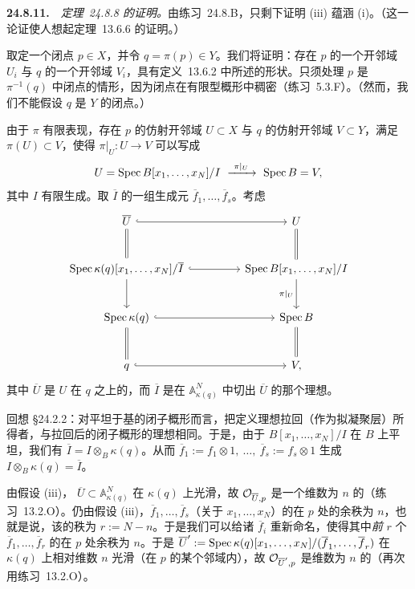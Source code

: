 \textbf{24.8.11.}\ \extrahard\ \emph{\mbox{定理~24.8.8} 的证明。}\quad 由\mbox{练习~24.8.B}，只剩下证明 (iii) 蕴涵 (i)。（这一论证使人想起\mbox{定理~13.6.6} 的证明。）

取定一个闭点 $p\in X$，并令 $q=\pi(p)\in Y$。我们将证明：存在 $p$ 的一个开邻域 $U_i$ 与 $q$ 的一个开邻域 $V_i$，具有\mbox{定义~13.6.2} 中所述的形状。只须处理 $p$ 是 $\pi^{-1}(q)$ 中闭点的情形，因为闭点在有限型概形中稠密（\mbox{练习~5.3.F}）。（然而，我们不能假设 $q$ 是 $Y$ 的闭点。）

由于 $\pi$ 有限表现，存在 $p$ 的仿射开邻域 $U\subset X$ 与 $q$ 的仿射开邻域 $V\subset Y$，满足 $\pi(U)\subset V$，使得\trMorphism{} $\pi|_U\colon U\to V$ 可以写成
\[
U=\Spec B[x_1,\dots,x_N]/I\ \xrightarrow{\ \pi|_U\ }\ \Spec B=V,
\]
其中 $I$ 有限生成。取 $\overline{I}$ 的一组生成元 $\overline{f}_1,\dots,\overline{f}_s$。考虑\trCartesianDiagram
\[
\begin{tikzcd}[row sep=2.6em, column sep=4.6em]
\overline{U} \ar[r, hook] \ar[d, equals] & U \ar[d, equals] \\
\Spec\kappa(q)[x_1,\dots,x_N]/\overline{I} \ar[r, hook] \ar[d] & \Spec B[x_1,\dots,x_N]/I \ar[d, "\pi|_U"'] \\
\Spec\kappa(q) \ar[r, hook] \ar[d, equals] & \Spec B \ar[d, equals] \\
q \ar[r, hook] & V,
\end{tikzcd}
\]
其中 $\overline{U}$ 是 $U$ 在 $q$ 之上的\trFiber，而 $\overline{I}$ 是在 $\mathbb{A}^N_{\kappa(q)}$ 中切出 $\overline{U}$ 的那个理想。

回想 \S24.2.2：对平坦于基的闭子概形而言，把定义理想拉回（作为拟凝聚层）所得者，与拉回后的闭子概形的理想相同。于是，由于 $B[x_1,\dots,x_N]/I$ 在 $B$ 上平坦，我们有 $\overline{I}=I\otimes_B\kappa(q)$。从而 $\overline{f}_1:=f_1\otimes 1,\ \dots,\ \overline{f}_s:=f_s\otimes 1$ 生成 $I\otimes_B\kappa(q)=\overline{I}$。

由假设 (iii)，\trFiber{} $\overline{U}\subset\mathbb{A}^N_{\kappa(q)}$ 在 $\kappa(q)$ 上光滑，故 $\mathcal{O}_{\overline{U},p}$ 是一个维数为 $n$ 的\trIntegralDomain（\mbox{练习~13.2.O}）。仍由假设 (iii)，$\overline{f}_1,\dots,\overline{f}_s$（关于 $x_1,\dots,x_N$）的\trJacobianMatrix{}在 $p$ 处的余秩为 $n$，也就是说，该\trJacobianMatrix{}的秩为 $r:=N-n$。于是我们可以给诸 $\overline{f}_i$ 重新命名，使得其中\emph{前} $r$ 个 $\overline{f}_1,\dots,\overline{f}_r$ 的\trJacobianMatrix{}在 $p$ 处余秩为 $n$。于是 $\overline{U}':=\operatorname{Spec}\kappa(q)[x_1,\dots,x_N]/(\overline{f}_1,\dots,\overline{f}_r)$ 在 $\kappa(q)$ 上相对维数 $n$ 光滑（在 $p$ 的某个邻域内），故 $\mathcal{O}_{\overline{U}',p}$ 是维数为 $n$ 的\trIntegralDomain（再次用\mbox{练习~13.2.O}）。


